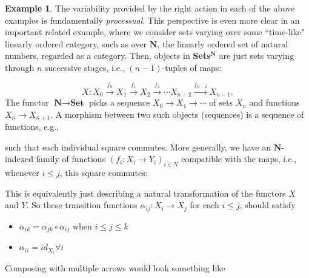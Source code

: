\documentclass[11pt]{book}
\theoremstyle{definition}
\newtheorem{example}{Example}[section]
\theoremstyle{definition}
\theoremstyle{definition}
\theoremstyle{theorem}
\theoremstyle{definition}
\begin{document}
\begin{example}
		The variability provided by the right action in each of the above examples is fundamentally \textit{processual}. This perspective is even more clear in an important related example, where we consider sets varying over some ``time-like" linearly ordered category, such as over $\textbf{N}$, the linearly ordered set of natural numbers, regarded as a category. Then, objects in \textbf{Sets$^{\textbf{N}}$} are just sets varying through $n$ successive stages, i.e., $(n-1)$-tuples of maps: \par
		\begin{equation*}
		X: 	X_0 \xrightarrow{f_0} X_1 \xrightarrow{f_1} X_2 \xrightarrow{f_2} \cdots X_{n-2} \xrightarrow{f_{n-2}} X_{n-1}.  
		\end{equation*} 
		The functor $\textbf{N} \rightarrow \textbf{Set}$ picks a sequence $X_0 \rightarrow X_1 \rightarrow \cdots$ of sets $X_n$ and functions $X_n \rightarrow X_{n+1}$. A morphism between two such objects (sequences) is a sequence of functions, e.g., 
		\begin{center} 
		\end{center} 
		such that each individual square commutes. More generally, we have an $\textbf{N}$-indexed family of functions $(f_i: X_i \rightarrow Y_i)_{i \in N}$ compatible with the maps, i.e., whenever $i \leq j$, this square commutes: 
		\begin{center}  
		\end{center}  
		This is equivalently just describing a natural transformation of the functors $X$ and $Y$. So these transition functions $\alpha_{ij}: X_i \rightarrow X_j$ for each $i \leq j$, should satisfy
		\begin{itemize}
			\item $\alpha_{ik} = \alpha_{jk} \circ \alpha_{ij}$ when $i\leq j \leq k$
			\item $\alpha_{ii} = id_{X_i} \forall i$
		\end{itemize}
		Composing with multiple arrows would look something like 
		\begin{center} 

\end{center}
\end{example}
\end{document}
